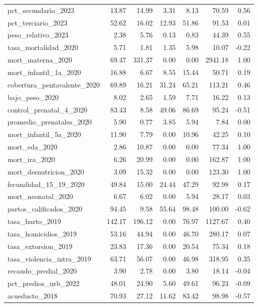 \begin{longtable}[t]{lrrrrrr}
pct\_secundario\_2023 & 13.87 & 14.99 & 3.31 & 8.13 & 70.59 & 0.56\\
pct\_terciario\_2023 & 52.62 & 16.02 & 12.93 & 51.86 & 91.53 & 0.01\\
peso\_relativo\_2023 & 2.38 & 5.76 & 0.13 & 0.83 & 44.39 & 0.55\\
tasa\_mortalidad\_2020 & 5.71 & 1.81 & 1.35 & 5.98 & 10.07 & -0.22\\
\addlinespace
mort\_materna\_2020 & 69.47 & 331.37 & 0.00 & 0.00 & 2941.18 & 1.00\\
mort\_infantil\_1a\_2020 & 16.88 & 6.67 & 8.55 & 15.44 & 50.71 & 0.19\\
cobertura\_pentavalente\_2020 & 69.89 & 16.21 & 31.24 & 65.21 & 113.21 & 0.46\\
bajo\_peso\_2020 & 8.02 & 2.65 & 1.59 & 7.71 & 16.22 & 0.13\\
control\_prenatal\_4\_2020 & 83.43 & 8.58 & 49.06 & 86.69 & 95.24 & -0.51\\
\addlinespace
promedio\_prenatales\_2020 & 5.90 & 0.77 & 3.85 & 5.94 & 7.84 & 0.00\\
mort\_infantil\_5a\_2020 & 11.90 & 7.79 & 0.00 & 10.96 & 42.25 & 0.10\\
mort\_eda\_2020 & 2.86 & 10.87 & 0.00 & 0.00 & 77.34 & 1.00\\
mort\_ira\_2020 & 6.26 & 20.99 & 0.00 & 0.00 & 162.87 & 1.00\\
mort\_desnutricion\_2020 & 3.09 & 15.32 & 0.00 & 0.00 & 123.30 & 1.00\\
\addlinespace
fecundidad\_15\_19\_2020 & 49.84 & 15.00 & 24.44 & 47.29 & 92.98 & 0.17\\
mort\_neonatal\_2020 & 6.67 & 6.02 & 0.00 & 5.94 & 28.17 & 0.03\\
partos\_calificados\_2020 & 94.45 & 9.58 & 55.64 & 98.48 & 100.00 & -0.62\\
tasa\_hurto\_2019 & 142.17 & 196.12 & 0.00 & 76.97 & 1127.67 & 0.40\\
tasa\_homicidios\_2019 & 53.16 & 44.94 & 0.00 & 46.70 & 280.17 & 0.07\\
\addlinespace
tasa\_extorsion\_2019 & 23.83 & 17.36 & 0.00 & 20.54 & 75.34 & 0.18\\
tasa\_violencia\_intra\_2019 & 63.71 & 56.07 & 0.00 & 46.98 & 318.95 & 0.35\\
recaudo\_predial\_2020 & 3.90 & 2.78 & 0.00 & 3.80 & 18.14 & -0.04\\
pct\_predios\_urb\_2022 & 48.01 & 24.90 & 5.60 & 49.61 & 96.23 & -0.09\\
acueducto\_2018 & 70.93 & 27.12 & 11.62 & 83.42 & 98.98 & -0.57\\

\end{longtable}
